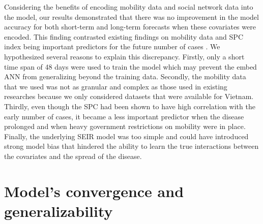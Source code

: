 Considering the benefits of encoding mobility data and social network data into the model, our results demonstrated that there was no improvement in the model accuracy for both short-term and long-term forecasts when these covariates were encoded.
This finding contrasted existing findings on mobility data and \gls{SPC} index being important predictors for the future number of cases \cite{changMobilityNetworkModels2021,kuchlerGeographicSpreadCOVID192020,arikInterpretableSequenceLearning,liSubstantialUndocumentedInfection2020}.
We hypothesized several reasons to explain this discrepancy.
Firstly, only a short time span of 48 days were used to train the model which may prevent the embed \gls{ANN} from generalizing beyond the training data.
Secondly, the mobility data that we used was not as granular and complex as those used in existing researches because we only considered datasets that were available for Vietnam.
Thirdly, even though the \gls{SPC} had been shown to have high correlation with the early number of cases, it became a less important predictor when the disease prolonged and when heavy government restrictions on mobility were in place.
Finally, the underlying \gls{SEIR} model was too simple and could have introduced strong model bias that hindered the ability to learn the true interactions between the covariates and the spread of the disease.

\section{Model's convergence and generalizability}